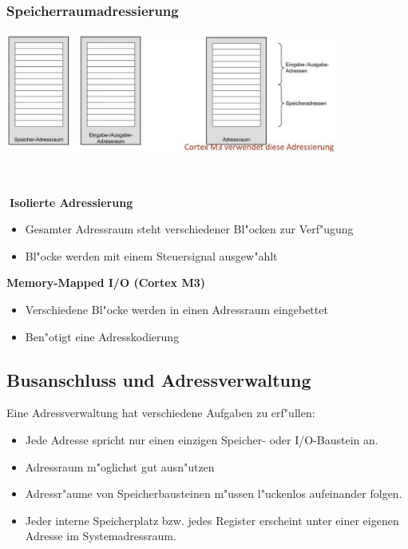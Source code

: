 \subsubsection{Speicherraumadressierung}
\begin{minipage}{11cm}
	\includegraphics[width=11cm]{images/Speicherraumadressierung}
\end{minipage}
%
\begin{minipage}{0.5cm}
	\-\
\end{minipage}
%
\begin{minipage}{7cm}
	\textbf{Isolierte Adressierung}
		\begin{itemize}
		\item Gesamter Adressraum steht verschiedener Bl"ocken zur Verf"ugung
		\item Bl"ocke werden mit einem Steuersignal ausgew"ahlt
	\end{itemize}
	\textbf{Memory-Mapped I/O (Cortex M3)}
	\begin{itemize}
		\item Verschiedene Bl"ocke werden in einen Adressraum eingebettet
		\item Ben"otigt eine Adresskodierung
	\end{itemize}
\end{minipage}

\newpage
\subsection{Busanschluss und Adressverwaltung}
Eine Adressverwaltung hat verschiedene Aufgaben zu erf"ullen:
\begin{itemize}
	\item Jede Adresse spricht nur einen einzigen Speicher- oder I/O-Baustein an.
	\item Adressraum m"oglichst gut ausn"utzen
	\item Adressr"aume von Speicherbausteinen m"ussen l"uckenlos aufeinander folgen.
	\item Jeder interne Speicherplatz bzw. jedes Register erscheint unter einer eigenen Adresse im Systemadressraum.
\end{itemize}

